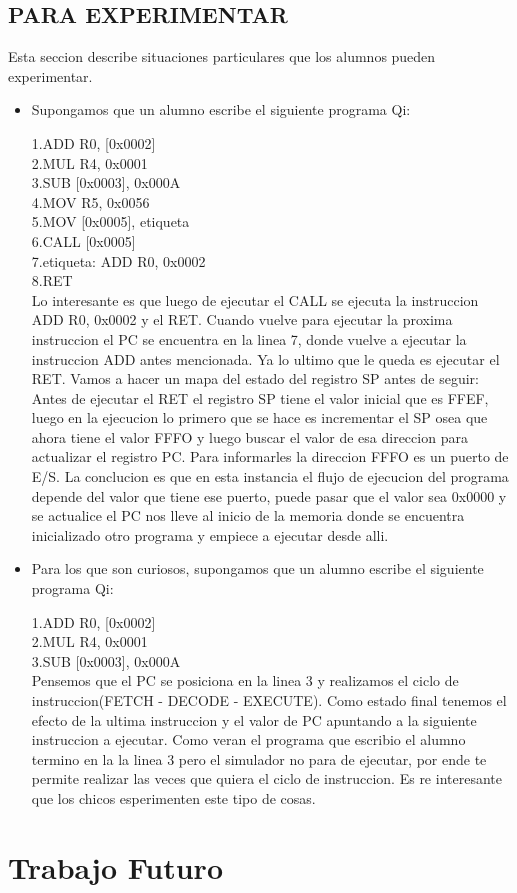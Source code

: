 \subsection{PARA EXPERIMENTAR}

Esta seccion describe situaciones particulares que los alumnos pueden experimentar.

\begin{itemize}

\item Supongamos que un alumno escribe el siguiente programa Qi:

1.ADD R0, [0x0002]\\
2.MUL R4, 0x0001 \\
3.SUB [0x0003], 0x000A \\
4.MOV R5, 0x0056 \\
5.MOV [0x0005], etiqueta \\
6.CALL [0x0005] \\
7.etiqueta: ADD R0, 0x0002 \\
8.RET \\

Lo interesante es que luego de ejecutar el CALL se ejecuta la instruccion ADD R0, 0x0002 y el RET. Cuando vuelve para ejecutar la proxima instruccion el PC se encuentra en la linea 7, donde vuelve a ejecutar la instruccion ADD antes mencionada. Ya lo ultimo que le queda es ejecutar el RET.
Vamos a hacer un mapa del estado del registro SP antes de seguir: Antes de ejecutar el RET  el registro SP tiene el valor inicial que es FFEF, luego en la ejecucion lo primero que se hace es incrementar el SP osea que ahora tiene el valor FFFO y luego buscar el valor de esa direccion para actualizar el registro PC. Para informarles la direccion FFFO es un puerto de E/S. La conclucion es que en esta instancia el flujo de ejecucion del programa depende del valor que tiene ese puerto, puede pasar que el valor sea 0x0000 y se actualice el PC nos lleve al inicio de la memoria donde se encuentra inicializado otro programa y empiece a ejecutar desde alli. 


\item Para los que son curiosos, supongamos que un alumno escribe el siguiente programa Qi:

1.ADD R0, [0x0002]\\
2.MUL R4, 0x0001 \\
3.SUB [0x0003], 0x000A \\

Pensemos que el PC se posiciona en la linea 3 y realizamos el ciclo de instruccion(FETCH - DECODE - EXECUTE). Como estado final tenemos el efecto de la ultima instruccion y el valor de PC apuntando a la siguiente instruccion a ejecutar. Como veran el programa que escribio el alumno termino en la la linea 3 pero el simulador no para de ejecutar, por ende te permite realizar las veces que quiera el ciclo de instruccion. Es re interesante que los chicos esperimenten este tipo de cosas.

\end{itemize} 


\section{Trabajo Futuro}

